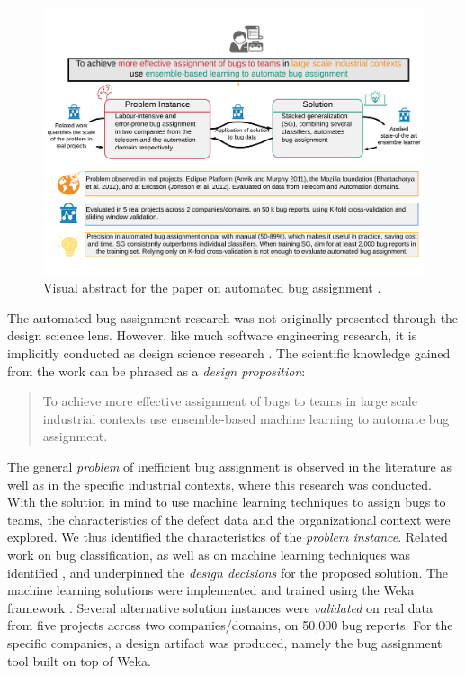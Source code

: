\documentclass[graybox]{svmult}
\begin{document}
\begin{figure}[t]
\begin{center}
\includegraphics[width=\columnwidth, trim={5mm 20mm 5mm 20mm },clip]{Figures/VATemplateJonsson.pdf}
\caption{Visual abstract for the paper on automated bug assignment \cite{JonssonBug15}.}
\label{fig:BugAssignment}
\end{center}
\end{figure}

The automated bug assignment research was not originally presented through the design science lens. However, like much software engineering research, it is implicitly conducted as design science research \cite{Engstrom19arxiv}. 
The scientific knowledge gained from the work can be phrased as a \emph{design proposition}:
\begin{quote}{To achieve more effective assignment of bugs to teams in large scale industrial contexts use ensemble-based machine learning to automate bug assignment. \cite{StoreyESEM17}}\end{quote}

The general \emph{problem} of inefficient bug assignment is observed in the literature as well as in the specific industrial contexts, where this research was conducted. With the solution in mind to use machine learning techniques to assign bugs to teams, the characteristics of the defect data and the organizational context were explored. We thus identified the characteristics of the \emph{problem instance}. Related work on bug classification, as well as on machine learning techniques was identified \cite{Borg2013EMSE}, and underpinned the \emph{design decisions} for the proposed solution. The machine learning solutions were implemented  and trained using the Weka framework \cite{hall_weka_2009}. Several alternative solution instances were \emph{validated} on real data from five projects across two companies/domains, on 50,000 bug reports. For the specific companies, a design artifact was produced, namely the bug assignment tool built on top of Weka.
\end{document}
